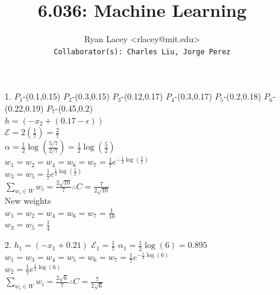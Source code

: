 \documentclass{article}
\begin{document}

\title{6.036: Machine Learning}
\author{
  Ryan Lacey <rlacey@mit.edu>\\
  \footnotesize \texttt{Collaborator(s): Charles Liu, Jorge Perez}
}
        
\maketitle
        

\begin{enumerate}
\item[1.]
	$P_1$-(0.1,0.15)  $P_2$-(0.3,0.15) $P_3$-(0.12,0.17) $P_4$-(0.3,0.17) $P_5$-(0.2,0.18) $P_6$-(0.22,0.19) $P_7$-(0.45,0.2)\\

	$h = (-x_2 + (0.17-\epsilon))$\\

	$\mathcal{E} = 2(\frac{1}{7}) = \frac{2}{7}$\\
	
	$\alpha = \frac{1}{2} \log \left(\frac{5/7}{2/7}\right) = \frac{1}{2} \log \left(\frac{5}{2}\right)$\\
	
	$w_1=w_2=w_4=w_6=w_7=\frac{1}{7}e^{-\frac{1}{2} \log \left(\frac{5}{2}\right)}$\\
	$w_3=w_5=\frac{1}{7}e^{\frac{1}{2} \log \left(\frac{5}{2}\right)}$\\	
	
	$\displaystyle\sum_{w_i \in W}{w_i} = \frac{2\sqrt{10}}{7} \therefore C=\frac{7}{2\sqrt{10}}$\\
	
	New weights\\
	$w_1=w_2=w_4=w_6=w_7=\frac{1}{10} $\\
	$w_3=w_5=\frac{1}{4}$\\

\newpage

\item[2.]
		$h_1 = (-x_1 + 0.21)$ \hfill $\mathcal{E}_1 = \frac{1}{7}$ \hfill $\alpha_1 = \frac{1}{2} \log \left(6\right) = 0.895$\\
		
		$w_1=w_3=w_4=w_5=w_6=w_7=\frac{1}{7}e^{-\frac{1}{2} \log \left(6\right)}$\\
		$w_2=\frac{1}{7}e^{\frac{1}{2} \log \left(6\right)}$\\	
		
		$\displaystyle\sum_{w_i \in W}{w_i} = \frac{2\sqrt{6}}{7} \therefore C=\frac{7}{2\sqrt{6}}$\\
		

\end{enumerate}
\end{document}
